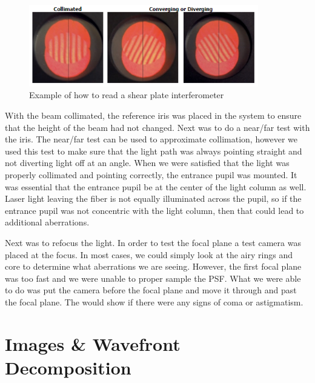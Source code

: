 \begin{figure}[H]
    \centering
    \includegraphics[width = 10cm]{Figures/shear_coll.png}
    \caption{Example of how to read a shear plate interferometer \cite{ShearingInterferometers}}
    \label{fig:shear_read}
\end{figure}

With the beam collimated, the reference iris was placed in the system to ensure that the height of the beam had not changed.  Next was to do a near/far test with the iris.  The near/far test can be used to approximate collimation, however we used this test to make sure that the light path was always pointing straight and not diverting light off at an angle.  When we were satisfied that the light was properly collimated and pointing correctly, the entrance pupil was mounted.  It was essential that the entrance pupil be at the center of the light column as well.  Laser light leaving the fiber is not equally illuminated across the pupil, so if the entrance pupil was not concentric with the light column, then that could lead to additional aberrations.

Next was to refocus the light.  In order to test the focal plane a test camera was placed at the focus.  In most cases, we could simply look at the airy rings and core to determine what aberrations we are seeing.  However, the first focal plane was too fast and we were unable to proper sample the PSF.  What we were able to do was put the camera before the focal plane and move it through and past the focal plane.  The would show if there were any signs of coma or astigmatism.



\section{Images \& Wavefront Decomposition}